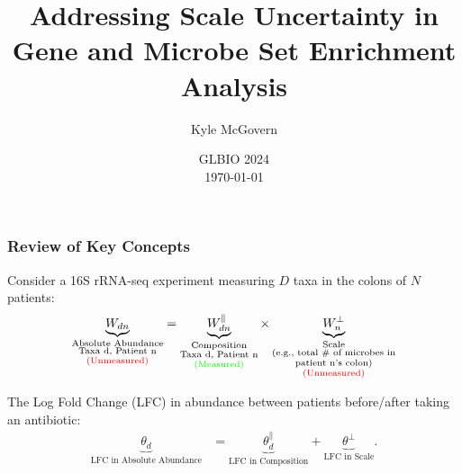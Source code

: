 \documentclass[11pt,t]{beamer}
\title[DSA Scale Uncertainty]{Addressing Scale Uncertainty in Gene and Microbe Set Enrichment Analysis}
\author[Kyle McGovern]{Kyle McGovern}
\institute[Penn State]{The Pennsylvania State University \\ \smallskip \textit{kvm6065@psu.edu}}
\date[\today]{GLBIO 2024 \\ \today}
\begin{document}

\begin{frame}
	\titlepage %
\end{frame}

\begin{frame}
    \frametitle{Review of Key Concepts}

    Consider a 16S rRNA-seq experiment measuring \(D\) taxa in the colons of \(N\) patients:
    \begin{align*}
      \underbrace{W_{dn}}_{\substack{\text{Absolute Abundance} \\ \text{Taxa d, Patient n} \\ \text{\textcolor{red}{(Unmeasured)}}}} = \underbrace{W^\parallel_{dn}}_{\substack{\text{Composition} \\ \text{Taxa d, Patient n} \\ \text{\textcolor{green}{(Measured)}}}} \times \underbrace{W^\perp_n}_{\substack{\text{Scale} \\ \text{(e.g., total \# of microbes in} \\ \text{patient n's colon)} \\ \text{\textcolor{red}{(Unmeasured)}}}}
    \end{align*}

    \pause

    The Log Fold Change (LFC) in abundance between patients before/after taking an antibiotic:
    \begin{align*}
        \underbrace{\theta_d}_{\text{LFC in Absolute Abundance}} &= \underbrace{\theta^{\parallel}_d}_{\text{LFC in Composition}}+\underbrace{\theta^\perp}_{\text{LFC in Scale}}. \nonumber
    \end{align*}
\end{frame}
\end{document}
